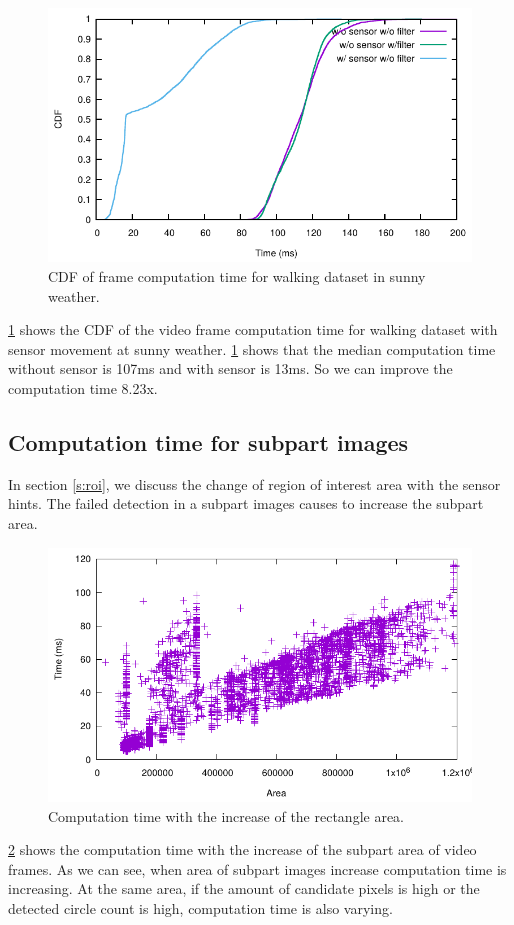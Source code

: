 \begin{figure}[h!]
\centering
\includegraphics[width=5.2in]{plots/sunny_cdf_time.pdf}
\caption{CDF of frame computation time for walking dataset in sunny weather.}
\label{f:cdf_sunny}
\end{figure}

\ref{f:cdf_sunny} shows the CDF of the video frame computation time for walking dataset with sensor movement at sunny weather.
\ref{f:cdf_sunny} shows that the median computation time without sensor is 107ms and with sensor is 13ms.
So we can improve the computation time 8.23x.

\subsection{Computation time for subpart images}
In section \ref{s:roi}, we discuss the change of region of interest area with the sensor hints.
The failed detection in a subpart images causes to increase the subpart area. 

\begin{figure}[h!]
\centering
\includegraphics[width=5.2in]{plots/sunny_recarea.pdf}
\caption{Computation time with the increase of the rectangle area.}
\label{f:recarea}
\end{figure}
\ref{f:recarea} shows the computation time with the increase of the subpart area of video frames.
As we can see, when area of subpart images increase computation time is increasing.
At the same area, if the amount of candidate pixels is high or the detected circle count is high, computation time is also varying.

